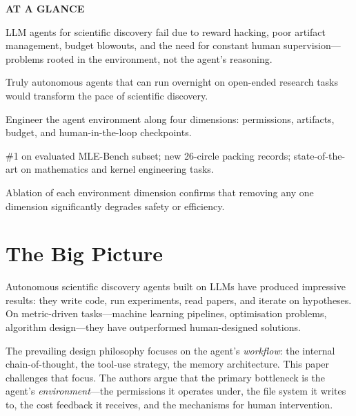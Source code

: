 \documentclass[10pt,twocolumn]{article}
\begin{document}
\begin{mdframed}[backgroundcolor=boxgray,linecolor=rulered,linewidth=1pt,
    innerleftmargin=6pt,innerrightmargin=6pt,
    innertopmargin=6pt,innerbottommargin=6pt]
\textbf{\small AT A GLANCE}\par\vspace{4pt}
\begin{description}[leftmargin=0pt,labelsep=4pt,itemsep=2pt,parsep=0pt,
    font=\small\bfseries]
  \item[Problem:] LLM agents for scientific discovery fail due to
    reward hacking, poor artifact management, budget blowouts, and
    the need for constant human supervision---problems rooted in the
    environment, not the agent's reasoning.
  \item[Why it matters:] Truly autonomous agents that can run overnight
    on open-ended research tasks would transform the pace of scientific
    discovery.
  \item[Method:] Engineer the agent environment along four dimensions:
    permissions, artifacts, budget, and human-in-the-loop checkpoints.
  \item[Result:] \#1 on evaluated MLE-Bench subset; new 26-circle
    packing records; state-of-the-art on mathematics and kernel
    engineering tasks.
  \item[Evidence:] Ablation of each environment dimension confirms that
    removing any one dimension significantly degrades safety or efficiency.
\end{description}
\end{mdframed}

\section{The Big Picture}

Autonomous scientific discovery agents built on LLMs have produced
impressive results: they write code, run experiments, read papers, and
iterate on hypotheses. On metric-driven tasks---machine learning pipelines,
optimisation problems, algorithm design---they have outperformed
human-designed solutions.

The prevailing design philosophy focuses on the agent's \emph{workflow}:
the internal chain-of-thought, the tool-use strategy, the memory
architecture. This paper challenges that focus. The authors argue that
the primary bottleneck is the agent's \emph{environment}---the
permissions it operates under, the file system it writes to, the cost
feedback it receives, and the mechanisms for human intervention.
\end{document}
